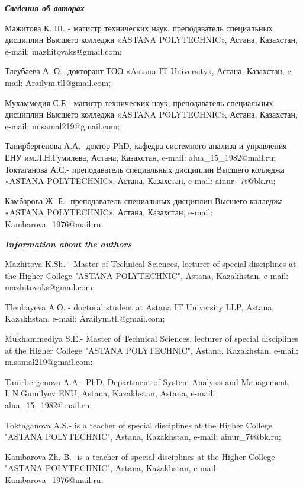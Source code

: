 \begin{info}
\emph{{\bfseries Сведения об авторах}}

Мажитова К. Ш. - магистр технических наук, преподаватель специальных
дисциплин Высшего колледжа «ASTANA POLYTECHNIC», Астана, Казахстан,
e-mail: mazhitovaks@gmail.com;

Тлеубаева А. О.- докторант ТОО «Astana IT University», Астана,
Казахстан, e-mail: Arailym.tll@gmail.com;

Мухаммедия С.Е.- магистр технических наук, преподаватель специальных
дисциплин Высшего колледжа «ASTANA POLYTECHNIC», Астана, Казахстан,
e-mail: m.samal219@gmail.com;

Танирбергенова А.А.- доктор PhD, кафедра системного анализа и управления
ЕНУ им.Л.Н.Гумилева, Астана, Казахстан, e-mail:
alua\_15\_1982@mail.ru;
Токтаганова А.С.- преподаватель специальных дисциплин Высшего колледжа
«ASTANA POLYTECHNIC», Астана, Казахстан, e-mail:
ainur\_7t@bk.ru;

Камбарова Ж. Б.- преподаватель специальных дисциплин Высшего колледжа
«ASTANA POLYTECHNIC», Астана, Казахстан, e-mail:
Kambarova\_1976@mail.ru.

\emph{{\bfseries Information about the authors}}

Mazhitova K.Sh. - Master of Technical Sciences, lecturer of special
disciplines at the Higher College "ASTANA POLY\-TECHNIC", Astana,
Kazakhstan, e-mail: mazhitovaks@gmail.com;

Tleubayeva A.О. - doctoral student at Astana IT University LLP,
Astana, Kazakhstan, e-mail: Arailym.tll@gmail.com;

Mukhammediya S.E.- Master of Technical Sciences, lecturer of special
disciplines at the Higher College "ASTANA POLY\-TECHNIC", Astana,
Kazakhstan, e-mail: m.samal219@gmail.com;

Tanirbergenova A.A.- PhD, Department of System Analysis and
Management, L.N.Gumilyov ENU, Astana, Kazakhstan, Astana, e-mail:
alua\_15\_1982@mail.ru;

Toktaganova A.S.- is a teacher of special disciplines at the Higher
College "ASTANA POLYTECHNIC", Astana, Kazakhstan, e-mail:
ainur\_7t@bk.ru;

Kambarova Zh. B.- is a teacher of special disciplines at the Higher
College "ASTANA POLYTECHNIC", Astana, Kazakhstan, e-mail:
Kambarova\_1976@mail.ru.
\end{info}
